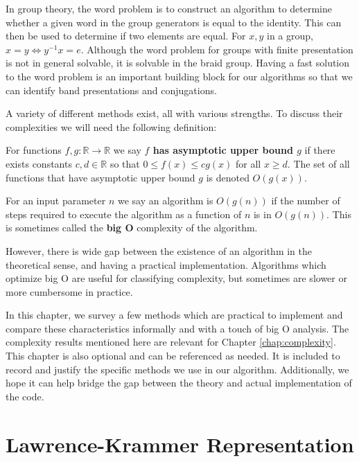 \documentclass[12pt]{thesis}
\begin{document}
\label{chap:word-problem}

In group theory, the word problem is
to construct an algorithm to determine whether a given word
in the group generators is equal
to the identity.
This can then be used to determine if two elements are equal.
For $x, y$ in a group, $x = y \Leftrightarrow y^{-1}x = e$.
Although the word problem for groups with finite presentation is not in general solvable,
it is solvable in the braid group.
Having a fast solution to the word problem is an important building block for our algorithms
so that we can identify band presentations
and conjugations.

A variety of different methods exist, all with various strengths.
To discuss their complexities we will need the following definition:
\begin{definition}
    \cite{clrs}
    For functions $f, g \colon \mathbb{R} \rightarrow \mathbb{R}$ 
    we say \textbf{$f$ has asymptotic upper bound $g$} if
    there exists constants $c, d \in \mathbb{R}$
    so that $0 \leq f(x) \leq cg(x)$ for all $x \geq d$.
    The set of all functions that have asymptotic upper bound $g$
    is denoted $O(g(x))$.
\end{definition}
\begin{definition}
    For an input parameter $n$
    we say an algorithm is $O(g(n))$
    if the number of steps required to execute
    the algorithm as a function of $n$ is in $O(g(n))$.
    This is sometimes called the \textbf{big O} complexity
    of the algorithm.
\end{definition}
However, there is wide gap between the existence of an algorithm
in the theoretical sense, and having a practical implementation.
Algorithms which optimize big O are useful for classifying complexity,
but sometimes are slower or more cumbersome in practice. 

In this chapter, we survey a few methods which are practical to implement
and compare these characteristics informally and with a touch of big O analysis.
The complexity results mentioned here are relevant for Chapter \ref{chap:complexity}.
This chapter is also optional and can be referenced as needed.
It is included to record and justify the specific methods we use in our algorithm.
Additionally, we hope it can help bridge the gap between the theory 
and actual implementation of the code. 

\section{Lawrence-Krammer Representation}
\end{document}
